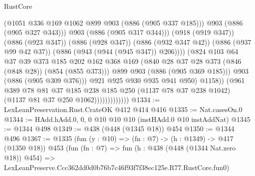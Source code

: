 \begin{lexlean}{RustCore}
\begin{coremodule}
                                          (@1051 @336 @169 @1062 @899 @903 (@886 (@905 @337 @185)))
                                          @903
                                          (@886 (@905 @327 @343)))
                                        @903
                                        (@886 (@905 @317 @344)))
                                      (@918 (@919 @347))
                                      (@886 (@923 @347))
                                      (@886 (@928 @347))
                                      (@886 (@932 @347 @42))
                                      (@886 (@937 @99 @42 @37))
                                      (@886 (@943 (@944 (@945 @347)) @206))))
                                  (@824
                                    @103
                                    @64
                                    @37
                                    @39
                                    @373
                                    @185
                                    @202
                                    @162
                                    @368
                                    @169
                                    (@840 @28 @37 @28 @373 (@846 (@848 @28)) (@854 (@855 @373)))
                                    @899
                                    @903
                                    (@886 (@905 @369 @185)))
                                  @903
                                  (@886 (@905 @309 @376)))
                                @921
                                @925
                                @930
                                @935
                                @941
                                @950)
                              @1158))
                          (@961
                            @389
                            @78
                            @81
                            @37
                            @185
                            @238
                            @185
                            @250
                            (@1137 @78 @37 @238 @1042)
                            (@1137 @81 @37 @250 @1062)))))))))))))
@1334 := LexLeanPreservation.Rust.CrateOK @412 @414 @416
@1335 := Nat.casesOn.{0}
@1344 := HAdd.hAdd.{0, 0, 0} @10 @10 @10 (instHAdd.{0} @10 instAddNat)
@1345 := @1344 @498
@1349 := @438 (@448 (@1345 @18)) @454
@1350 := @1344 @496
@1367 := @1335
    (fun (y : @10) => (fn : @7) -> (h : @1349) -> @417 (@1350 @18))
    @453
    (fun (fn : @7) =>
    fun (h : @438 (@448 (@1344 Nat.zero @18)) @454) =>
    LexLeanPreserve.Ccc362dd0d0b76b7c46f93f7f38ec125e.R77.RustCore.fun0)

\end{coremodule}
\end{lexlean}
